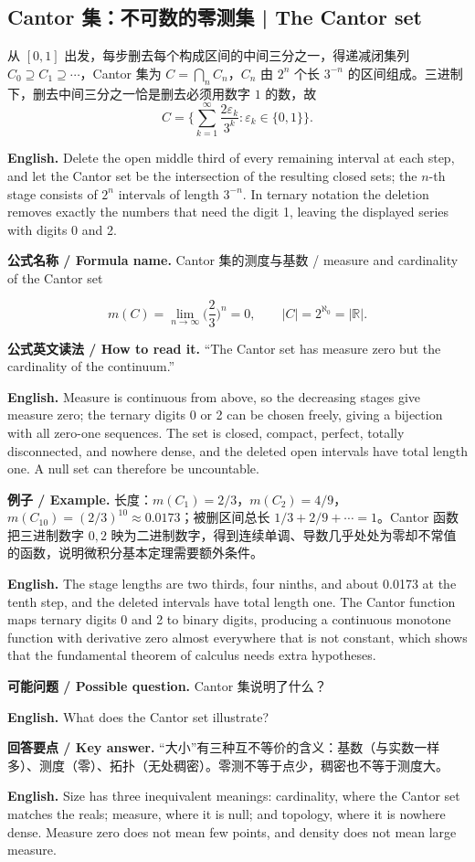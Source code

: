 \documentclass[UTF8,11pt,a4paper]{ctexart}
\newcommand{\EN}[1]{\par\noindent\textbf{English.} #1\par}
\newcommand{\READ}[1]{\par\noindent\textbf{公式英文读法 / How to read it.} #1\par}
\let\APSsubsection\subsection
\renewcommand{\subsection}[1]{\Needspace{6\baselineskip}\APSsubsection{#1}}
\newcommand{\FORMULA}[2]{\par\Needspace{3\baselineskip}\noindent\textbf{公式名称 / Formula name.} #1 / #2\par}
\newcommand{\EX}[2]{\par\noindent\textbf{例子 / Example.} #1\par\EN{#2}}
\newcommand{\ASK}[4]{\par\noindent\textbf{可能问题 / Possible question.} #1\par\EN{#2}\noindent\textbf{回答要点 / Key answer.} #3\par\EN{#4}\medskip}
\begin{document}
\subsection{Cantor 集：不可数的零测集 | The Cantor set}
\noindent 从 $[0,1]$ 出发，每步删去每个构成区间的中间三分之一，得递减闭集列 $C_0\supseteq C_1\supseteq\cdots$，Cantor 集为 $C=\bigcap_nC_n$，$C_n$ 由 $2^n$ 个长 $3^{-n}$ 的区间组成。三进制下，删去中间三分之一恰是删去必须用数字 $1$ 的数，故
\[
C=\Big\{\sum_{k=1}^{\infty}\frac{2\varepsilon_k}{3^k}:\varepsilon_k\in\{0,1\}\Big\}.
\]
\EN{Delete the open middle third of every remaining interval at each step, and let the Cantor set be the intersection of the resulting closed sets; the $n$-th stage consists of $2^n$ intervals of length $3^{-n}$. In ternary notation the deletion removes exactly the numbers that need the digit 1, leaving the displayed series with digits 0 and 2.}
\FORMULA{Cantor 集的测度与基数}{measure and cardinality of the Cantor set}
\[
m(C)=\lim_{n\to\infty}\Big(\frac23\Big)^n=0,
\qquad
|C|=2^{\aleph_0}=|\mathbb R|.
\]
\READ{“The Cantor set has measure zero but the cardinality of the continuum.”}
\EN{Measure is continuous from above, so the decreasing stages give measure zero; the ternary digits 0 or 2 can be chosen freely, giving a bijection with all zero-one sequences. The set is closed, compact, perfect, totally disconnected, and nowhere dense, and the deleted open intervals have total length one. A null set can therefore be uncountable.}
\EX{长度：$m(C_1)=2/3$，$m(C_2)=4/9$，$m(C_{10})=(2/3)^{10}\approx0.0173$；被删区间总长 $1/3+2/9+\cdots=1$。Cantor 函数把三进制数字 $0,2$ 映为二进制数字，得到连续单调、导数几乎处处为零却不常值的函数，说明微积分基本定理需要额外条件。}{The stage lengths are two thirds, four ninths, and about 0.0173 at the tenth step, and the deleted intervals have total length one. The Cantor function maps ternary digits 0 and 2 to binary digits, producing a continuous monotone function with derivative zero almost everywhere that is not constant, which shows that the fundamental theorem of calculus needs extra hypotheses.}
\ASK{Cantor 集说明了什么？}{What does the Cantor set illustrate?}{“大小”有三种互不等价的含义：基数（与实数一样多）、测度（零）、拓扑（无处稠密）。零测不等于点少，稠密也不等于测度大。}{Size has three inequivalent meanings: cardinality, where the Cantor set matches the reals; measure, where it is null; and topology, where it is nowhere dense. Measure zero does not mean few points, and density does not mean large measure.}
\end{document}
